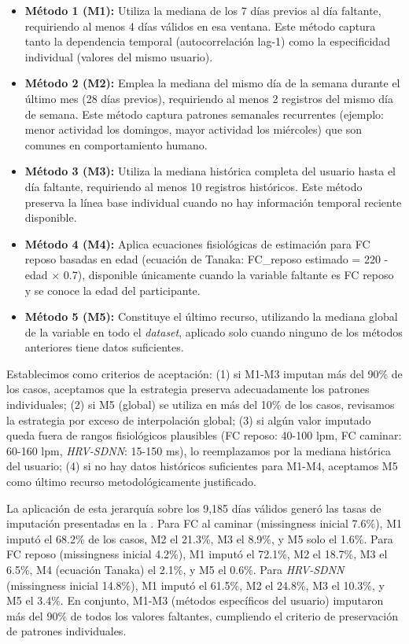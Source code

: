 \begin{itemize}
    \item \textbf{Método 1 (M1):} Utiliza la mediana de los 7 días previos al día faltante, requiriendo al menos 4 días válidos en esa ventana. Este método captura tanto la dependencia temporal (autocorrelación lag-1) como la especificidad individual (valores del mismo usuario).
    
    \item \textbf{Método 2 (M2):} Emplea la mediana del mismo día de la semana durante el último mes (28 días previos), requiriendo al menos 2 registros del mismo día de semana. Este método captura patrones semanales recurrentes (ejemplo: menor actividad los domingos, mayor actividad los miércoles) que son comunes en comportamiento humano.
    
    \item \textbf{Método 3 (M3):} Utiliza la mediana histórica completa del usuario hasta el día faltante, requiriendo al menos 10 registros históricos. Este método preserva la línea base individual cuando no hay información temporal reciente disponible.
    
    \item \textbf{Método 4 (M4):} Aplica ecuaciones fisiológicas de estimación para FC reposo basadas en edad (ecuación de Tanaka: FC\_reposo estimado = 220 - edad × 0.7), disponible únicamente cuando la variable faltante es FC reposo y se conoce la edad del participante.
    
    \item \textbf{Método 5 (M5):} Constituye el último recurso, utilizando la mediana global de la variable en todo el \textit{dataset}, aplicado solo cuando ninguno de los métodos anteriores tiene datos suficientes.
\end{itemize}

Establecimos como criterios de aceptación: (1) si M1-M3 imputan más del 90\% de los casos, aceptamos que la estrategia preserva adecuadamente los patrones individuales; (2) si M5 (global) se utiliza en más del 10\% de los casos, revisamos la estrategia por exceso de interpolación global; (3) si algún valor imputado queda fuera de rangos fisiológicos plausibles (FC reposo: 40-100 lpm, FC caminar: 60-160 lpm, \textit{HRV-SDNN}: 15-150 ms), lo reemplazamos por la mediana histórica del usuario; (4) si no hay datos históricos suficientes para M1-M4, aceptamos M5 como último recurso metodológicamente justificado.

La aplicación de esta jerarquía sobre los 9,185 días válidos generó las tasas de imputación presentadas en la . Para FC al caminar (missingness inicial 7.6\%), M1 imputó el 68.2\% de los casos, M2 el 21.3\%, M3 el 8.9\%, y M5 solo el 1.6\%. Para FC reposo (missingness inicial 4.2\%), M1 imputó el 72.1\%, M2 el 18.7\%, M3 el 6.5\%, M4 (ecuación Tanaka) el 2.1\%, y M5 el 0.6\%. Para \textit{HRV-SDNN} (missingness inicial 14.8\%), M1 imputó el 61.5\%, M2 el 24.8\%, M3 el 10.3\%, y M5 el 3.4\%. En conjunto, M1-M3 (métodos específicos del usuario) imputaron más del 90\% de todos los valores faltantes, cumpliendo el criterio de preservación de patrones individuales.

